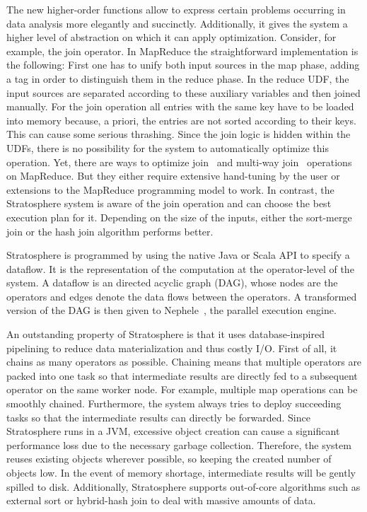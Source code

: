 The new higher-order functions allow to express certain problems occurring in data analysis more elegantly and succinctly.
Additionally, it gives the system a higher level of abstraction on which it can apply optimization.
Consider, for example, the join operator.
In MapReduce the straightforward implementation is the following:
First one has to unify both input sources in the map phase, adding a tag in order to distinguish them in the reduce phase.
In the reduce UDF, the input sources are separated according to these auxiliary variables and then joined manually.
For the join operation all entries with the same key have to be loaded into memory because, a priori, the entries are not sorted according to their keys.
This can cause some serious thrashing.
Since the join logic is hidden within the UDFs, there is no possibility for the system to automatically optimize this operation.
Yet, there are ways to optimize join~\cite{blanas:2010a} and multi-way join~\cite{afrati:2010a} operations on MapReduce.
But they either require extensive hand-tuning by the user or extensions to the MapReduce programming model to work.
In contrast, the Stratosphere system is aware of the join operation and can choose the best execution plan for it.
Depending on the size of the inputs, either the sort-merge join or the hash join algorithm performs better.

Stratosphere is programmed by using the native Java or Scala API to specify a dataflow.
It is the representation of the computation at the operator-level of the system.
A dataflow is an directed acyclic graph (DAG), whose nodes are the operators and edges denote the data flows between the operators.
A transformed version of the DAG is then given to Nephele~\cite{warneke:2009a}, the parallel execution engine.

An outstanding property of Stratosphere is that it uses database-inspired pipelining to reduce data materialization and thus costly I/O.
First of all, it chains as many operators as possible.
Chaining means that multiple operators are packed into one task so that intermediate results are directly fed to a subsequent operator on the same worker node.
For example, multiple map operations can be smoothly chained.
Furthermore, the system always tries to deploy succeeding tasks so that the intermediate results can directly be forwarded.
Since Stratosphere runs in a JVM, excessive object creation can cause a significant performance loss due to the necessary garbage collection.
Therefore, the system reuses existing objects wherever possible, so keeping the created number of objects low.
In the event of memory shortage, intermediate results will be gently spilled to disk.
Additionally, Stratosphere supports out-of-core algorithms such as external sort or hybrid-hash join to deal with massive amounts of data.

